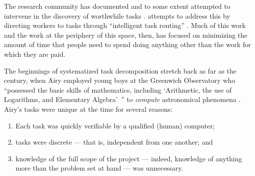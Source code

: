 \documentclass[trackingWork]{subfiles}
\begin{document}
The research community has documented and to some extent attempted to intervene in
the discovery of worthwhile tasks
\cite{taskSearch}.
\citeauthor{Cosley:2007:SUI:1216295.1216309}
attempts to address this by
directing workers to tasks through
``intelligent task routing''
\cite{Cosley:2007:SUI:1216295.1216309}.
Much of this work and the work at the periphery of this space, then,
has focused on
minimizing the amount of time that people need to spend doing
anything other than the work for which they are paid.


\subsubsubsection{\pieceworkpers}
The beginnings of systematized task decomposition stretch back as far as the  century,
when Airy employed young boys at the Greenwich Observatory who
``possessed the basic skills of mathematics, including
`Arithmetic, the use of Logarithms, and Elementary Algebra'~''
to \textit{compute} astronomical phenomena
\cite{grier2013computers}.
Airy's tasks were unique at the time for several reasons:
\begin{enumerate}
  \item Each task was quickly verifiable by a qualified (human) computer;
  \item tasks were discrete --- that is, independent from one another; and
  \item knowledge of the full scope of the project
  --- indeed, knowledge of anything more than the problem set at hand ---
  was unnecessary.
\end{enumerate}


\subsubsubsection{\whatchanged}



\end{document}
